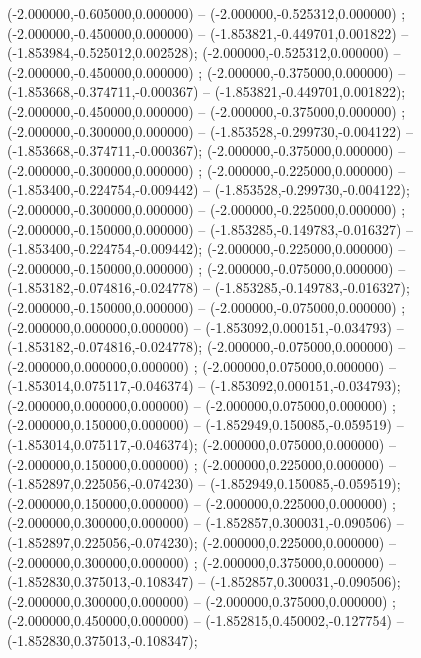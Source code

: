  (-2.000000,-0.605000,0.000000) -- (-2.000000,-0.525312,0.000000) ;
 (-2.000000,-0.450000,0.000000) -- (-1.853821,-0.449701,0.001822) -- (-1.853984,-0.525012,0.002528);
 (-2.000000,-0.525312,0.000000) -- (-2.000000,-0.450000,0.000000) ;
 (-2.000000,-0.375000,0.000000) -- (-1.853668,-0.374711,-0.000367) -- (-1.853821,-0.449701,0.001822);
 (-2.000000,-0.450000,0.000000) -- (-2.000000,-0.375000,0.000000) ;
 (-2.000000,-0.300000,0.000000) -- (-1.853528,-0.299730,-0.004122) -- (-1.853668,-0.374711,-0.000367);
 (-2.000000,-0.375000,0.000000) -- (-2.000000,-0.300000,0.000000) ;
 (-2.000000,-0.225000,0.000000) -- (-1.853400,-0.224754,-0.009442) -- (-1.853528,-0.299730,-0.004122);
 (-2.000000,-0.300000,0.000000) -- (-2.000000,-0.225000,0.000000) ;
 (-2.000000,-0.150000,0.000000) -- (-1.853285,-0.149783,-0.016327) -- (-1.853400,-0.224754,-0.009442);
 (-2.000000,-0.225000,0.000000) -- (-2.000000,-0.150000,0.000000) ;
 (-2.000000,-0.075000,0.000000) -- (-1.853182,-0.074816,-0.024778) -- (-1.853285,-0.149783,-0.016327);
 (-2.000000,-0.150000,0.000000) -- (-2.000000,-0.075000,0.000000) ;
 (-2.000000,0.000000,0.000000) -- (-1.853092,0.000151,-0.034793) -- (-1.853182,-0.074816,-0.024778);
 (-2.000000,-0.075000,0.000000) -- (-2.000000,0.000000,0.000000) ;
 (-2.000000,0.075000,0.000000) -- (-1.853014,0.075117,-0.046374) -- (-1.853092,0.000151,-0.034793);
 (-2.000000,0.000000,0.000000) -- (-2.000000,0.075000,0.000000) ;
 (-2.000000,0.150000,0.000000) -- (-1.852949,0.150085,-0.059519) -- (-1.853014,0.075117,-0.046374);
 (-2.000000,0.075000,0.000000) -- (-2.000000,0.150000,0.000000) ;
 (-2.000000,0.225000,0.000000) -- (-1.852897,0.225056,-0.074230) -- (-1.852949,0.150085,-0.059519);
 (-2.000000,0.150000,0.000000) -- (-2.000000,0.225000,0.000000) ;
 (-2.000000,0.300000,0.000000) -- (-1.852857,0.300031,-0.090506) -- (-1.852897,0.225056,-0.074230);
 (-2.000000,0.225000,0.000000) -- (-2.000000,0.300000,0.000000) ;
 (-2.000000,0.375000,0.000000) -- (-1.852830,0.375013,-0.108347) -- (-1.852857,0.300031,-0.090506);
 (-2.000000,0.300000,0.000000) -- (-2.000000,0.375000,0.000000) ;
 (-2.000000,0.450000,0.000000) -- (-1.852815,0.450002,-0.127754) -- (-1.852830,0.375013,-0.108347);
